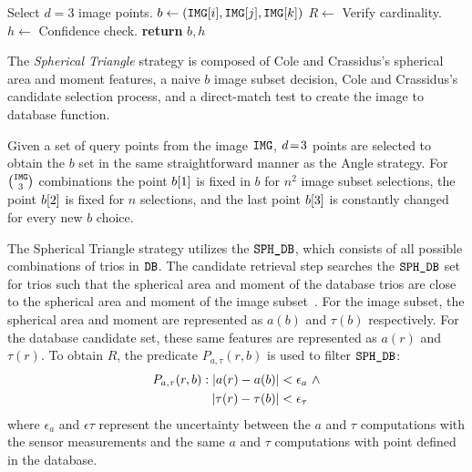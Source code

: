 \begin{algorithm}
\begin{algorithmic}[1]
        \LineComment Select $d=3$ image points.
        \State $b \gets \left(\texttt{IMG}[i], \texttt{IMG}[j], \texttt{IMG}[k]\right)$ 
        \State $R \gets $ 
         \Comment Verify cardinality.
        \State $h \gets $ 
        \invalidBijection \Comment Confidence check.
        \State \textbf{return} $b, h$
        \EndIf
        \EndIf
        \EndFor
        \EndFor
        \EndFor
        \EndProcedure
    \end{algorithmic}
\end{algorithm}

The \textit{Spherical Triangle} strategy is composed of Cole and Crassidus's spherical area and moment features, a naive $b$ image subset decision, Cole and Crassidus's candidate selection process, and a direct-match test to create the image to database function.

Given a set of query points from the image $\texttt{IMG}$, $d \!=\! 3$ points are selected to obtain the $b$ set in the same straightforward manner as the Angle strategy.
For $\binom{\texttt{IMG}}{3}$ combinations the point $b[1]$ is fixed in $b$ for $n^2$ image subset selections, the point $b[2]$ is fixed for $n$ selections, and the last point $b[3]$ is constantly changed for every new $b$ choice.

The Spherical Triangle strategy utilizes the $\texttt{SPH\_DB}$, which consists of all possible combinations of trios in $\texttt{DB}$.
The candidate retrieval step searches the $\texttt{SPH\_DB}$ set for trios such that the spherical area and moment of the database trios are close to the spherical area and moment of the image subset~\cite{coleAndCrassidis:sphericalTriangleMethod}.
For the image subset, the spherical area and moment are represented as $a(b)$ and $\tau(b)$ respectively.
For the database candidate set, these same features are represented as $a(r)$ and $\tau(r)$.
To obtain $R$, the predicate $P_{a, \tau}(r, b)$ is used to filter $\texttt{SPH\_DB}$:
\begin{equation}
    \begin{aligned}
        P_{a, \tau}(r, b) : \left|  a(r) - a(b) \right| &< \epsilon_{a}
        \ \land \\ \left| \tau(r) - \tau(b) \right| &< \epsilon_{\tau}
    \end{aligned}
\end{equation}
where $\epsilon_{a}$ and $\epsilon{\tau}$ represent the uncertainty between the $a$ and $\tau$ computations with the sensor measurements and the same $a$ and $\tau$ computations with point defined in the database.

